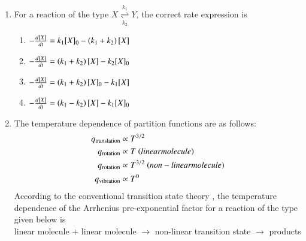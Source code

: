 \documentclass[journal,12pt,onecolumn]{IEEEtran}
\theoremstyle{remark}
\begin{document}
\begin{enumerate}
\item For a reaction of the type $X\underset{k_{2}}{\stackrel{k_{1}}{\rightleftharpoons}}Y$, the correct rate expression is 
    \begin{enumerate}
        \item $-\frac{d[X]}{dt}=k_{1}[X]_{0}-\left(k_{1}+k_{2}\right)[X]$
        \item $-\frac{d[X]}{dt}=\left(k_{1}+k_{2}\right)[X]-k_{2}[X]_{0}$
        \item $-\frac{d[X]}{dt}=\left(k_{1}+k_{2}\right)[X]_{0}-k_{1}[X]$
        \item $-\frac{d[X]}{dt}=\left(k_{1}-k_{2}\right)[X]-k_{1}[X]_{0}$
    \end{enumerate}
    \hfill{}



\item The temperature dependence of partition functions are as follows:
    \begin{align*}
        q_{\text{translation}} &\propto T^{3/2} \\
        q_{\text{rotation}} &\propto T \text{ \ensuremath{\left(linear molecule\right)}} \\
        q_{\text{rotation}} &\propto T^{3/2} \text{ \ensuremath{\left(non-linear molecule\right)}} \\
        q_{\text{vibration}} &\propto T^{0}
    \end{align*}
    According to the conventional transition state theory , the temperature dependence of the Arrhenius pre-exponential factor for a reaction of the type given below is \\
    linear molecule + linear molecule $\rightarrow$ non-linear transition state $\rightarrow$ products
    \begin{enumerate}
        \hfill{}
    \end{enumerate}
    


\end{enumerate}
\end{document}

